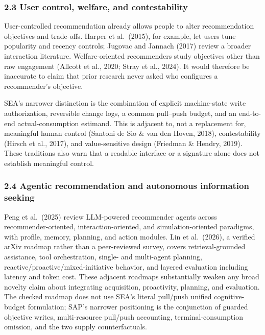 \documentclass[
  11pt]{article}
\begin{document}
\subsubsection{2.3 User control, welfare, and
contestability}\label{user-control-welfare-and-contestability}

User-controlled recommendation already allows people to alter
recommendation objectives and trade-offs. Harper et al.~(2015), for
example, let users tune popularity and recency controls; Jugovac and
Jannach (2017) review a broader interaction literature. Welfare-oriented
recommenders study objectives other than raw engagement (Allcott et al.,
2020; Stray et al., 2024). It would therefore be inaccurate to claim
that prior research never asked who configures a recommender's
objective.

SEA's narrower distinction is the combination of explicit machine-state
write authorization, reversible change logs, a common pull--push budget,
and an end-to-end actual-consumption estimand. This is adjacent to, not
a replacement for, meaningful human control (Santoni de Sio \& van den
Hoven, 2018), contestability (Hirsch et al., 2017), and value-sensitive
design (Friedman \& Hendry, 2019). These traditions also warn that a
readable interface or a signature alone does not establish meaningful
control.

\subsubsection{2.4 Agentic recommendation and autonomous information
seeking}\label{agentic-recommendation-and-autonomous-information-seeking}

Peng et al.~(2025) review LLM-powered recommender agents across
recommender-oriented, interaction-oriented, and simulation-oriented
paradigms, with profile, memory, planning, and action modules. Lin et
al.~(2026), a verified arXiv roadmap rather than a peer-reviewed survey,
covers retrieval-grounded assistance, tool orchestration, single- and
multi-agent planning, reactive/proactive/mixed-initiative behavior, and
layered evaluation including latency and token cost. These adjacent
roadmaps substantially weaken any broad novelty claim about integrating
acquisition, proactivity, planning, and evaluation. The checked roadmap
does not use SEA's literal pull/push unified cognitive-budget
formulation; SAP's narrower positioning is the conjunction of guarded
objective writes, multi-resource pull/push accounting,
terminal-consumption omission, and the two supply counterfactuals.
\end{document}

